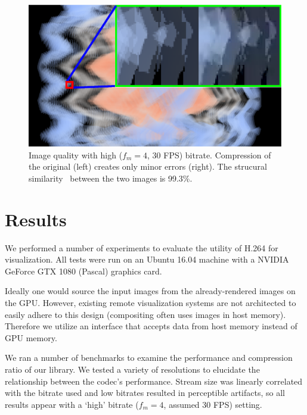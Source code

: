 \documentclass{vgtc}                          %
\begin{document}
\begin{figure}[h]
  \vspace{2.5mm}
  \centering
  \includegraphics[width=\columnwidth]{quality.eps}
  \caption{Image quality with high ($f_m=4$, 30 FPS) bitrate.
  Compression of the original (left) creates only minor errors (right).
  The strucural similarity~\cite{wang2004image} between the two images is
  99.3\%.}
  \label{fig:quality}
\end{figure}

\section{Results}


We performed a number of experiments to evaluate the utility of H.264
for visualization. All tests were run on an Ubuntu 16.04 machine with a
NVIDIA GeForce GTX 1080 (Pascal) graphics card.


Ideally one would source the input images from the already-rendered
images on the GPU. However, existing remote visualization systems are
not architected to easily adhere to this design (compositing often uses
images in host memory). Therefore we utilize an interface that accepts
data from host memory instead of GPU memory.

We ran a number of benchmarks to examine the performance and
compression ratio of our library. We tested a variety of resolutions to
elucidate the relationship between the codec's performance.  Stream
size was linearly correlated with the bitrate used and
low bitrates resulted in perceptible artifacts, so all results appear
with a `high' bitrate ($f_m=4$, assumed 30 FPS) setting.
\end{document}
